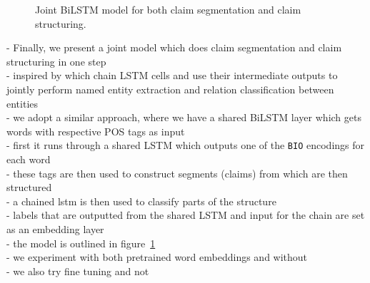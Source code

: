 \begin{figure}
	\caption{Joint BiLSTM model for both claim segmentation and claim 
	structuring. }
	\label{fig:joint_model}
\end{figure}

- Finally, we present a joint model which does claim segmentation 
and claim structuring in one step \\
- inspired by \citep{miwa2016end} which chain LSTM cells and use their intermediate outputs
to jointly perform named entity extraction and relation classification between entities \\
- we adopt a similar approach, where we have a shared BiLSTM layer which 
gets words with respective POS tags as input \\
- first it runs through a shared LSTM which outputs one of the \texttt{BIO} encodings
for each word \\
- these tags are then used to construct segments (claims) from which are then structured \\
- a chained lstm is then used to classify parts of the structure \\
- labels that are outputted from the shared LSTM and input for the chain are set
as an embedding layer \\
- the model is outlined in figure~\ref{fig:joint_model} \\

- we experiment with both pretrained word embeddings and without \\
- we also try fine tuning and not \\

